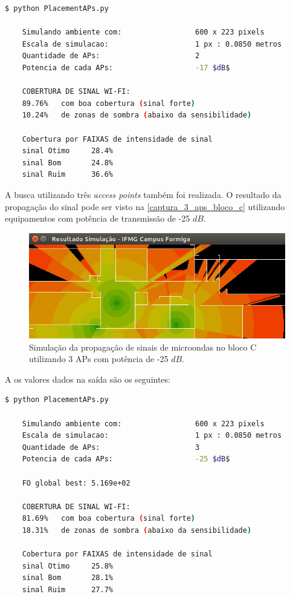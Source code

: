 \documentclass[
	12pt,				%
	twoside,			%
	a4paper,			%
	english,			%
	french,				%
	spanish,			%
	brazil				%
	]{abntex2}
\begin{document}
\begin{lstlisting}[language=bash]
    $ python PlacementAPs.py 
    
    Simulando ambiente com:                 600 x 223 pixels
    Escala de simulacao:                    1 px : 0.0850 metros
    Quantidade de APs:                      2
    Potencia de cada APs:                   -17 $dB$
    
    COBERTURA DE SINAL WI-FI:
    89.76%   com boa cobertura (sinal forte)
    10.24%   de zonas de sombra (abaixo da sensibilidade)
    
    Cobertura por FAIXAS de intensidade de sinal
    sinal Otimo     28.4%
    sinal Bom       24.8%
    sinal Ruim      36.6%
\end{lstlisting}

A busca utilizando três \emph{access points} também foi realizada. O
resultado da propagação do sinal pode ser visto na
\autoref{captura_3_aps_bloco_c} utilizando equipamentos com potência de
transmissão de -25 \(dB\).

\begin{figure}[ht]
    \caption{\label{captura_3_aps_bloco_c} Simulação da propagação de sinais de microondas no bloco C utilizando 3 APs com potência de -25 $dB$.
    }
    \begin{center}
        \includegraphics[scale=0.7]{imagens/captura-3-aps-bloco-c.jpg}
    \end{center}
\end{figure}

A os valores dados na saída são os seguintes:

\begin{lstlisting}[language=bash]
    $ python PlacementAPs.py 
    
    Simulando ambiente com:                 600 x 223 pixels
    Escala de simulacao:                    1 px : 0.0850 metros
    Quantidade de APs:                      3
    Potencia de cada APs:                   -25 $dB$
    
    FO global best: 5.169e+02
    
    COBERTURA DE SINAL WI-FI:
    81.69%   com boa cobertura (sinal forte)
    18.31%   de zonas de sombra (abaixo da sensibilidade)
    
    Cobertura por FAIXAS de intensidade de sinal
    sinal Otimo     25.8%
    sinal Bom       28.1%
    sinal Ruim      27.7%
\end{lstlisting}
\end{document}
